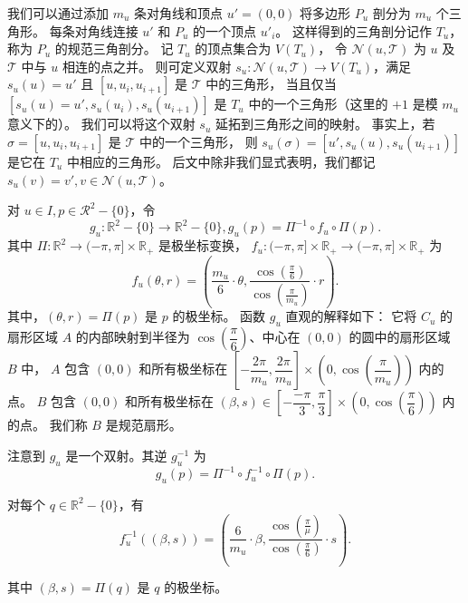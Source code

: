 \documentclass{ctexart}
\begin{document}
		我们可以通过添加 $m_u$ 条对角线和顶点 $u'=(0,0)$ 将多边形 $P_u$ 剖分为 $m_u$ 个三角形。
		每条对角线连接 $u'$ 和 $P_u$ 的一个顶点 $u'_i$。
		这样得到的三角剖分记作 $T_u$，称为 $P_u$ 的规范三角剖分。
		记 $T_u$ 的顶点集合为 $V(T_u)$，
		令 $\mathcal{N}(u,\mathcal{T})$ 为 $u$ 及 $\mathcal{T}$ 中与 $u$ 相连的点之并。
		则可定义双射 $s_u:\mathcal{N}(u,\mathcal{T})\rightarrow V(T_u)$，满足 $s_u(u)=u'$
		且 $[u,u_i,u_{i+1}]$ 是 $\mathcal{T}$ 中的三角形，
		当且仅当 $[s_u(u)=u',s_u(u_i),s_u(u_{i+1})]$ 是 $T_u$ 中的一个三角形（这里的 $+1$ 是模 $m_u$ 意义下的）。
		我们可以将这个双射 $s_u$ 延拓到三角形之间的映射。
		事实上，若 $\sigma = [u,u_i,u_{i+1}]$ 是 $\mathcal{T}$ 中的一个三角形，
		则 $s_u(\sigma) = [u',s_u(u),s_u(u_{i+1})]$ 是它在 $T_u$ 中相应的三角形。
		后文中除非我们显式表明，我们都记 $s_u(v)=v',v\in \mathcal{N}(u,\mathcal{T})$。

		对 $u\in I,p\in \mathcal{R}^2-\{0\}$，令
		\begin{equation}
			g_u:\mathbb{R}^2-\{0\}\rightarrow \mathbb{R}^2-\{0\},g_u(p) = \Pi^{-1}\circ f_u\circ \Pi(p).
		\end{equation}
		其中 $\Pi:\mathbb{R}^2\rightarrow (-\pi,\pi]\times \mathbb{R}_+$ 是极坐标变换，
		$f_u:(-\pi,\pi]\times \mathbb{R}_+\rightarrow (-\pi,\pi]\times \mathbb{R}_+$ 为
		\begin{equation}
			f_u(\theta,r) = (\dfrac{m_u}6 \cdot \theta, \dfrac{\cos(\frac{\pi}6)}{\cos(\frac{\pi}{m_u})}\cdot r).
		\end{equation}
		其中，$(\theta,r)=\Pi(p)$ 是 $p$ 的极坐标。
		函数 $g_u$ 直观的解释如下：
		它将 $C_u$ 的扇形区域 $A$ 的内部映射到半径为 $\cos(\dfrac{\pi}6)$、中心在 $(0,0)$ 的圆中的扇形区域 $B$ 中，
		$A$ 包含 $(0,0)$ 和所有极坐标在 $[-\dfrac{2\pi}{m_u},\dfrac{2\pi}{m_u}]\times (0,\cos(\dfrac{\pi}{m_u}))$ 内的点。
		$B$ 包含 $(0,0)$ 和所有极坐标在 $(\beta,s)\in [-\dfrac{-\pi}3,\dfrac{\pi}3]\times (0,\cos(\dfrac{\pi}6))$ 内的点。
		我们称 $B$ 是规范扇形。

		注意到 $g_u$ 是一个双射。其逆 $g_u^{-1}$ 为
		\begin{equation}
			g_u(p) = \Pi^{-1}\circ f_u^{-1}\circ \Pi(p).
		\end{equation}

		对每个 $q\in \mathbb{R}^2-\{0\}$，有
		\begin{equation}
			f_u^{-1}((\beta,s)) = (\dfrac 6{m_u}\cdot \beta,\dfrac{\cos(\frac{\pi}{\mu})}{\cos(\frac{\pi}6)}\cdot s).
		\end{equation}

		其中 $(\beta,s) = \Pi(q)$ 是 $q$ 的极坐标。
\end{document}
